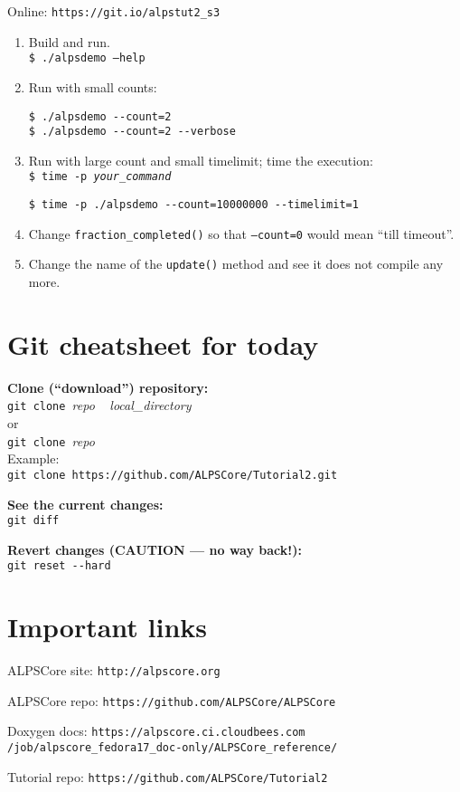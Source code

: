 \documentclass[12pt]{article}
\newcommand{\code}[1]{\texttt{#1}}
\begin{document}
Online: \nolinkurl{https://git.io/alpstut2_s3}

\begin{enumerate}
\item Build and run.\\
\code{\$ ./alpsdemo --help}
\item Run with small counts:
\begin{lstlisting}[]
$ ./alpsdemo --count=2
$ ./alpsdemo --count=2 --verbose
\end{lstlisting}
\item Run with large count and small timelimit; time the execution:\\
\code{\$ time -p \emph{your\_command}}
\begin{lstlisting}[emph={time}]
$ time -p ./alpsdemo --count=10000000 --timelimit=1
\end{lstlisting}%
\item Change \code{fraction\_completed()} so that \code{--count=0} would mean ``till timeout''.
\item Change the name of the \code{update()} method and see it does not compile any more.
\end{enumerate}

\section{Git cheatsheet for today}
\begin{flushleft}
\textbf{Clone (``download'') repository:}\\
\lstinline[style=showspaces]|git clone |\emph{repo}%
\lstinline[style=showspaces]| |%
\emph{local\_directory}\\
or \\
\lstinline[style=showspaces]|git clone |\emph{repo}\\
Example: \\
\lstinline[style=showspaces]|git clone https://github.com/ALPSCore/Tutorial2.git|

\textbf{See the current changes:}\\
\lstinline[style=showspaces]{git diff}

\textbf{Revert changes (CAUTION --- no way back!):}\\
\lstinline[style=showspaces]|git reset --hard|
\end{flushleft}

\section{Important links}
\begin{flushleft}
ALPSCore site: \nolinkurl{http://alpscore.org}

ALPSCore repo: \nolinkurl{https://github.com/ALPSCore/ALPSCore}

Doxygen docs: \nolinkurl{https://alpscore.ci.cloudbees.com}
              \nolinkurl{/job/alpscore_fedora17_doc-only/ALPSCore_reference/}

Tutorial repo: \nolinkurl{https://github.com/ALPSCore/Tutorial2}
\end{flushleft}
\end{document}
